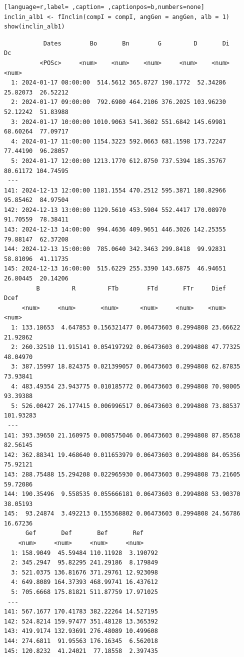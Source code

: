 \begin{itemize}
\begin{lstlisting}[language=r,label= ,caption= ,captionpos=b,numbers=none]
inclin_alb1 <- fInclin(compI = compI, angGen = angGen, alb = 1)
show(inclin_alb1)
\end{lstlisting}

\begin{verbatim}
		   Dates        Bo       Bn        G         D       Di        Dc
		  <POSc>     <num>    <num>    <num>     <num>    <num>     <num>
  1: 2024-01-17 08:00:00  514.5612 365.8727 190.1772  52.34286 25.82073  26.52212
  2: 2024-01-17 09:00:00  792.6980 464.2106 376.2025 103.96230 52.12242  51.83988
  3: 2024-01-17 10:00:00 1010.9063 541.3602 551.6842 145.69981 68.60264  77.09717
  4: 2024-01-17 11:00:00 1154.3223 592.0663 681.1598 173.72247 77.44190  96.28057
  5: 2024-01-17 12:00:00 1213.1770 612.8750 737.5394 185.35767 80.61172 104.74595
 ---                                                                             
141: 2024-12-13 12:00:00 1181.1554 470.2512 595.3871 180.82966 95.85462  84.97504
142: 2024-12-13 13:00:00 1129.5610 453.5904 552.4417 170.08970 91.70559  78.38411
143: 2024-12-13 14:00:00  994.4636 409.9651 446.3026 142.25355 79.88147  62.37208
144: 2024-12-13 15:00:00  785.0640 342.3463 299.8418  99.92831 58.81096  41.11735
145: 2024-12-13 16:00:00  515.6229 255.3390 143.6875  46.94651 26.80445  20.14206
	     B         R         FTb        FTd       FTr     Dief      Dcef
	 <num>     <num>       <num>      <num>     <num>    <num>     <num>
  1: 133.18653  4.647853 0.156321477 0.06473603 0.2994808 23.66622  21.92862
  2: 260.32510 11.915141 0.054197292 0.06473603 0.2994808 47.77325  48.04970
  3: 387.15997 18.824375 0.021399057 0.06473603 0.2994808 62.87835  73.93841
  4: 483.49354 23.943775 0.010185772 0.06473603 0.2994808 70.98005  93.39388
  5: 526.00427 26.177415 0.006996517 0.06473603 0.2994808 73.88537 101.93283
 ---                                                                        
141: 393.39650 21.160975 0.008575046 0.06473603 0.2994808 87.85638  82.56145
142: 362.88341 19.468640 0.011653979 0.06473603 0.2994808 84.05356  75.92121
143: 288.75488 15.294208 0.022965930 0.06473603 0.2994808 73.21605  59.72086
144: 190.35496  9.558535 0.055666181 0.06473603 0.2994808 53.90370  38.05193
145:  93.24874  3.492213 0.155368802 0.06473603 0.2994808 24.56786  16.67236
	  Gef       Def       Bef       Ref
	<num>     <num>     <num>     <num>
  1: 158.9049  45.59484 110.11928  3.190792
  2: 345.2947  95.82295 241.29186  8.179849
  3: 521.0375 136.81676 371.29761 12.923098
  4: 649.8089 164.37393 468.99741 16.437612
  5: 705.6668 175.81821 511.87759 17.971025
 ---                                       
141: 567.1677 170.41783 382.22264 14.527195
142: 524.8214 159.97477 351.48128 13.365392
143: 419.9174 132.93691 276.48089 10.499608
144: 274.6811  91.95563 176.16345  6.562018
145: 120.8232  41.24021  77.18558  2.397435
\end{verbatim}


\end{itemize}
